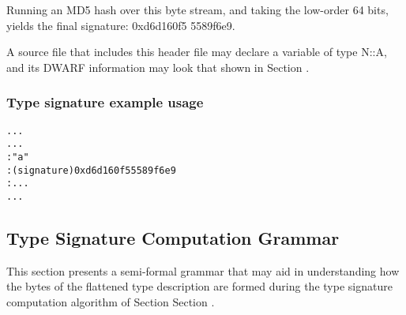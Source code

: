 Running an MD5 hash over this byte stream, and taking the
low-order 64 bits, yields the final signature: 0xd6d160f5
5589f6e9.


A source file that includes this header file may declare a
variable of type N::A, and its DWARF information may look
that shown in 
Section .


\subsubsection{Type signature example usage}
\label{app:typesignatureexampleusage}

\begin{alltt}
  ...
    ...
       : "a"
       : (signature) 0xd6d160f5 5589f6e9
       : ...
    ...
\end{alltt}

\subsection{Type Signature Computation Grammar}
\label{app:typesignaturecomputationgrammar}

This section
presents a semi-formal grammar that may aid in understanding
how the bytes of the flattened type description are formed
during the type signature computation algorithm of Section
Section . 

